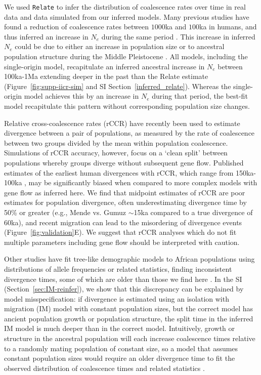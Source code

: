 \documentclass[]{article}
\begin{document}
We used \texttt{Relate} \citep{Speidel2019-nj} to infer the distribution of
coalescence rates over time in real data and data simulated from our inferred
models. Many previous studies have found a reduction of coalescence rates
between $1000$ka and $100$ka in humans, and thus inferred an increase in $N_e$
during the same period \citep{Li2011-le}.  This increase in inferred $N_e$
could be due to either an increase in population size or to ancestral
population structure during the Middle Pleistocene \citep{Mazet2016-wn}.  All
models, including the single-origin model, recapitulate an inferred ancestral
increase in $N_e$ between 100ka-1Ma extending deeper in the past than the
Relate estimate (Figure~\ref{fig:supp-iicr-sim} and SI
Section~\ref{inferred_relate}). Whereas the single-origin model achieves this by an
increase in $N_e$ during that period, the best-fit model recapitulate this
pattern without corresponding population size changes.     

Relative cross-coalescence rates (rCCR) have recently been used to estimate
divergence between a pair of populations, as measured by the rate of
coalescence between two groups divided by the mean within population
coalescence. Simulations of rCCR accuracy, however, focus on a ‘clean split’
between populations whereby groups diverge without subsequent gene flow.
Published estimates of the earliest human divergences with rCCR, which range
from 150ka-100ka \citep{Bergstrom2021-iw}, may be significantly biased when
compared to more complex models with gene flow as inferred here. We find that
midpoint estimates of rCCR are poor estimates for population divergence, often
underestimating divergence time by 50\% or greater (e.g., Mende vs. Gumuz
$\sim$15ka compared to a true divergence of 60ka), and recent migration can
lead to the misordering of divergence events (Figure~\ref{fig:validation}E). We
suggest that rCCR analyses which do not fit multiple parameters including gene
flow should be interpreted with caution.

Other studies have fit tree-like demographic models to African populations
using distributions of allele frequencies or related statistics, finding
inconsistent divergence times, some of which are older than those we find here
\cite{Henn2018-rf,Bergstrom2021-iw}. In the SI
(Section~\ref{sec:IM-reinfer}), we show that this discrepancy can be explained
by model misspecification: if divergence is estimated using an isolation with
migration (IM) model with constant population sizes, but the correct model has
ancient population growth or population structure, the split time in the
inferred IM model is much deeper than in the correct model. Intuitively, growth
or structure in the ancestral population will each increase coalescence times
relative to a randomly mating population of constant size, so a model that
assumes constant population sizes would require an older divergence time to fit
the observed distribution of coalescence times and related statistics
\citep{Momigliano2021-th,Shchur2022-wa}.  
\end{document}
